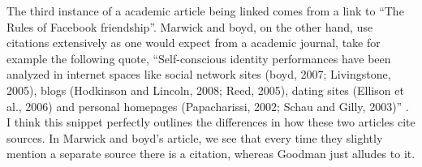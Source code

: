 \documentclass[12pt]{article}
\begin{document}
\begin{doublespace}
        The third instance of a academic article being linked comes from a link to ``The Rules of Facebook friendship''. 
        Marwick and boyd, on the other hand, use citations extensively as one would expect from a academic journal, take for example the following quote,
        ``Self-conscious identity performances have been analyzed in internet spaces like social network sites (boyd, 2007; Livingstone, 2005), blogs (Hodkinson and Lincoln, 2008; Reed, 2005), 
        dating sites (Ellison et al., 2006) and personal homepages (Papacharissi, 2002; Schau and Gilly, 2003)'' \autocite[115]{tweet}.
        I think this snippet perfectly outlines the differences in how these two articles cite sources. In Marwick and boyd's article, we see that every time they slightly mention a separate source there is a citation, whereas Goodman just alludes to it.
    \par%
    \par%
    \par%
    \newpage \printbibliography


    \end{doublespace}
\end{document}
